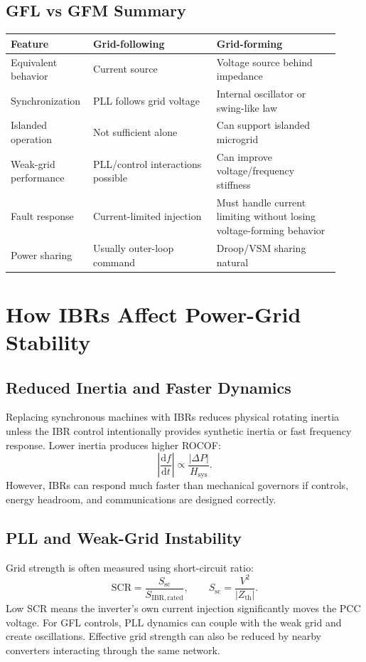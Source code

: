 \documentclass[11pt]{article}
\newcommand{\dd}{\mathrm{d}}
\begin{document}
\subsection{GFL vs GFM Summary}
\begin{longtable}{p{0.2\linewidth}p{0.36\linewidth}p{0.36\linewidth}}
\toprule
Feature & Grid-following & Grid-forming \\
\midrule
Equivalent behavior & Current source & Voltage source behind impedance \\
Synchronization & PLL follows grid voltage & Internal oscillator or swing-like law \\
Islanded operation & Not sufficient alone & Can support islanded microgrid \\
Weak-grid performance & PLL/control interactions possible & Can improve voltage/frequency stiffness \\
Fault response & Current-limited injection & Must handle current limiting without losing voltage-forming behavior \\
Power sharing & Usually outer-loop command & Droop/VSM sharing natural \\
\bottomrule
\end{longtable}

\section{How IBRs Affect Power-Grid Stability}

\subsection{Reduced Inertia and Faster Dynamics}
Replacing synchronous machines with IBRs reduces physical rotating inertia unless
the IBR control intentionally provides synthetic inertia or fast frequency
response. Lower inertia produces higher ROCOF:
\begin{equation}
\left|\frac{\dd f}{\dd t}\right|\propto \frac{|\Delta P|}{H_{\mathrm{sys}}}.
\end{equation}
However, IBRs can respond much faster than mechanical governors if controls,
energy headroom, and communications are designed correctly.

\subsection{PLL and Weak-Grid Instability}
Grid strength is often measured using short-circuit ratio:
\begin{equation}
\mathrm{SCR}=\frac{S_{\mathrm{sc}}}{S_{\mathrm{IBR,rated}}},
\qquad
S_{\mathrm{sc}}=\frac{V^2}{|Z_{\mathrm{th}}|}.
\end{equation}
Low SCR means the inverter's own current injection significantly moves the PCC
voltage. For GFL controls, PLL dynamics can couple with the weak grid and create
oscillations. Effective grid strength can also be reduced by nearby converters
interacting through the same network.
\end{document}
